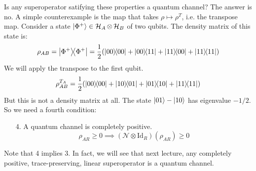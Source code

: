Is any superoperator satifying these properties a quantum channel? The answer is no. A simple counterexample is the map that takes $\rho \mapsto \rho^T$, i.e. the transpose map.
Consider a state $\ket{\Phi^+} \in \operatorname{\mathcal{H}}_A \otimes \operatorname{\mathcal{H}}_B$ of two qubits. The density matrix of this state is:
\[ \rho_{AB} = \ketbra{\Phi^+} = \frac{1}{2} \qty(\ketbra{00} + \ketbra{00}{11} + \ketbra{11}{00} + \ketbra{11}) \]
We will apply the transpose to the first qubit.
\[ \rho_{AB}^{T_A} = \frac{1}{2} \qty(\ketbra{00} + \ketbra{10}{01} + \ketbra{01}{10} + \ketbra{11}) \]
But this is not a density matrix at all. The state $\ket{01} - \ket{10}$ has eigenvalue $-1/2$. So we need a fourth condition:

\begin{itemize}
\item [4.] A quantum channel is completely positive. 
\[ \rho_{AR} \geq 0 \implies (\mathcal{N} \otimes \textrm{Id}_R)(\rho_{AR}) \geq 0\]
\end{itemize}
Note that 4 implies 3. In fact, we will see that next lecture, any completely positive, trace-preserving,
linear superoperator is a quantum channel.